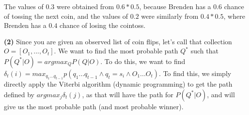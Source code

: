 \documentclass[11pt]{article}
\renewcommand{\part}[1] {\vspace{.10in} {\bf (#1)}}
\begin{document}

The values of $0.3$ were obtained from $0.6 * 0.5$, because Brenden has a $0.6$ chance of tossing the next coin, and the values of $0.2$ were similarly from $0.4 * 0.5$, where Brenden has a $0.4$ chance of losing the cointoss. 

\part{2}
Since you are given an observed list of coin flips, let's call that collection $O = [O_1, ..., O_t]$. We want to find the most probable path $Q^*$ such that $P(Q^*|O) = argmax_QP(Q|O)$. To do this, we want to find $\delta_t(i) = max_{q_1...q_{t-1}} p(q_1...q_{t-1} \wedge q_t = s_i \wedge O_1...O_t)$. To find this, we simply directly apply the Viterbi algorithm (dynamic programming) to get the path defined by $argmax_j \delta_t(j)$, as that will have the path for $P(Q^*|O)$, and will give us the most probable path (and most probable winner). 
\end{document}
